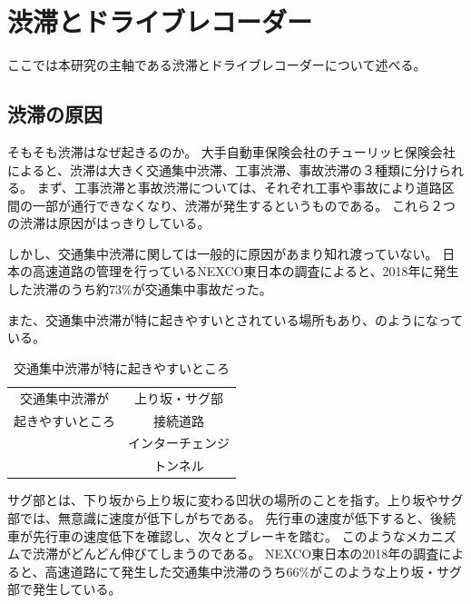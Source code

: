 \chapter{渋滞とドライブレコーダー}
ここでは本研究の主軸である渋滞とドライブレコーダーについて述べる。
\section{渋滞の原因}
そもそも渋滞はなぜ起きるのか。
大手自動車保険会社のチューリッヒ保険会社によると、渋滞は大きく交通集中渋滞、工事渋滞、事故渋滞の３種類に分けられる\cite{zurich}。
まず、工事渋滞と事故渋滞については、それぞれ工事や事故により道路区間の一部が通行できなくなり、渋滞が発生するというものである。
これら２つの渋滞は原因がはっきりしている。

しかし、交通集中渋滞に関しては一般的に原因があまり知れ渡っていない。
日本の高速道路の管理を行っているNEXCO東日本の調査によると、2018年に発生した渋滞のうち約73\%が交通集中事故だった\cite{NEXCOeast}。

また、交通集中渋滞が特に起きやすいとされている場所もあり、のようになっている。

\begin{table}[htbp]
  \centering
  \begin{scriptsize}
\begin{tabular}{cc}
  \toprule
  交通集中渋滞が & 上り坂・サグ部 \\
  起きやすいところ & 接続道路 \\
   & インターチェンジ \\
   & トンネル \\
  \bottomrule
\end{tabular}
\end{scriptsize}
\caption{交通集中渋滞が特に起きやすいところ\cite{zurich}}
\label{tab:jam_place}
\end{table}

サグ部とは、下り坂から上り坂に変わる凹状の場所のことを指す。上り坂やサグ部では、無意識に速度が低下しがちである。
先行車の速度が低下すると、後続車が先行車の速度低下を確認し、次々とブレーキを踏む。
このようなメカニズムで渋滞がどんどん伸びてしまうのである。
NEXCO東日本の2018年の調査によると、高速道路にて発生した交通集中渋滞のうち66\%がこのような上り坂・サグ部で発生している\cite{NEXCOeast}。

